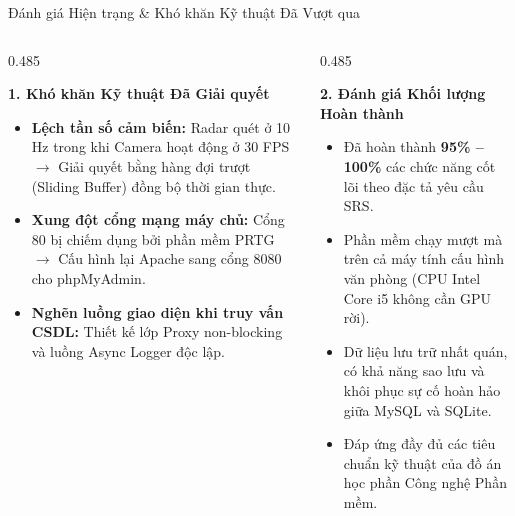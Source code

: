 \documentclass[aspectratio=169, 11pt]{beamer}
\begin{document}
\begin{frame}{Đánh giá Hiện trạng \& Khó khăn Kỹ thuật Đã Vượt qua}
  \vspace{-0.15cm}
  \begin{columns}[T, onlytextwidth]
    \begin{column}{0.485\textwidth}
      \begin{tcolorbox}[
        enhanced, colback=white, colframe=DarkMain, boxrule=0.9pt, arc=3.2pt,
        top=4pt, bottom=4pt, left=6pt, right=6pt
      ]
        {\fontsize{8.2pt}{9.8pt}\selectfont\bfseries\color{DarkMain} 1. Khó khăn Kỹ thuật Đã Giải quyết}\\[3pt]
        {\fontsize{7.0pt}{8.8pt}\selectfont
        \begin{itemize}
          \item \textbf{Lệch tần số cảm biến:} Radar quét ở 10 Hz trong khi Camera hoạt động ở 30 FPS $\rightarrow$ Giải quyết bằng hàng đợi trượt (Sliding Buffer) đồng bộ thời gian thực.
          \item \textbf{Xung đột cổng mạng máy chủ:} Cổng 80 bị chiếm dụng bởi phần mềm PRTG $\rightarrow$ Cấu hình lại Apache sang cổng 8080 cho phpMyAdmin.
          \item \textbf{Nghẽn luồng giao diện khi truy vấn CSDL:} Thiết kế lớp Proxy non-blocking và luồng Async Logger độc lập.
        \end{itemize}}
      \end{tcolorbox}
    \end{column}

    \begin{column}{0.485\textwidth}
      \begin{tcolorbox}[
        enhanced, colback=white, colframe=DarkMain, boxrule=0.9pt, arc=3.2pt,
        top=4pt, bottom=4pt, left=6pt, right=6pt
      ]
        {\fontsize{8.2pt}{9.8pt}\selectfont\bfseries\color{DarkMain} 2. Đánh giá Khối lượng Hoàn thành}\\[3pt]
        {\fontsize{7.0pt}{8.8pt}\selectfont
        \begin{itemize}
          \item Đã hoàn thành \textbf{95\% -- 100\%} các chức năng cốt lõi theo đặc tả yêu cầu SRS.
          \item Phần mềm chạy mượt mà trên cả máy tính cấu hình văn phòng (CPU Intel Core i5 không cần GPU rời).
          \item Dữ liệu lưu trữ nhất quán, có khả năng sao lưu và khôi phục sự cố hoàn hảo giữa MySQL và SQLite.
          \item Đáp ứng đầy đủ các tiêu chuẩn kỹ thuật của đồ án học phần Công nghệ Phần mềm.
        \end{itemize}}
      \end{tcolorbox}
    \end{column}
  \end{columns}
\end{frame}
\end{document}
